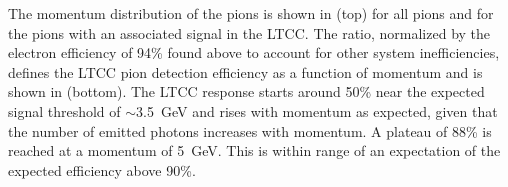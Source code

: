 The momentum distribution of the pions is shown in  (top) for all pions and for the pions with an
associated signal in the LTCC. The ratio, normalized by the electron efficiency of 94\% found above to account for
other system inefficiencies, defines the LTCC pion detection efficiency as a function of momentum and is shown in
 (bottom). The LTCC response starts around 50\% near the expected signal threshold of
$\sim$3.5~GeV and rises with momentum as expected, given that the number of emitted photons increases with
momentum. A plateau of 88\% is reached at a momentum of 5~GeV. This is within range of an expectation of
the expected efficiency above 90\%.
